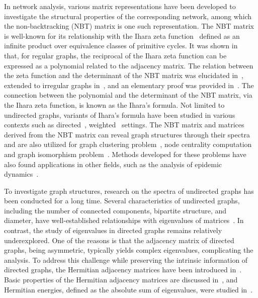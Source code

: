 \documentclass{article}
\theoremstyle{plain}
\begin{document}
In network analysis, various matrix representations have been developed to investigate the structural properties of the corresponding network,
among which the non-backtracking (NBT) matrix is one such representation.
The NBT matrix is well-known for its relationship with the Ihara zeta function~\citep{Ihara1966-bk} defined as an infinite product over equivalence classes of primitive cycles.
It was shown in~\citep{Ihara1966-bk,Sunada1986-kg} that, for regular graphs,
the reciprocal of the Ihara zeta function can be expressed as a polynomial related to the adjacency matrix.
The relation between the zeta function and the determinant of the NBT matrix was elucidated in~\citep{Hashimoto1989-su},
extended to irregular graphs in~\citep{Bass1992-ek}, and an elementary proof was provided in~\citep{Stark1996-mx}.
The connection between the polynomial and the determinant of the NBT matrix, via the Ihara zeta function, is known as the Ihara's formula.
Not limited to undirected graphs, variants of Ihara's formula have been studied in various contexts such as directed~\citep{Tarfulea2009-sy}, weighted~\citep{Kempton2016-ev,Konno2019-jd} settings.
The NBT matrix and matrices derived from the NBT matrix can reveal graph structures through their spectra~\citep{Jost2023-pj,Mulas2024-en}
and are also utilized for graph clustering problem~\citep{Krzakala2013-up,Newman2013-zc,Saade2014-vg,Bordenave2018-qo,Gulikers2017-iu}, node centrality computation~\citep{Martin2014-tv,Grindrod2018-va,Torres2021-nr,Timar2021-es} and graph isomorphism problem~\citep{Mulas2024-en}.
Methods developed for these problems have also found applications in other fields, such as the analysis of epidemic dynamics~\citep{Shrestha2015-ih, Radicchi2016-rm}.

To investigate graph structures, research on the spectra of undirected graphs has been conducted for a long time.
Several characteristics of undirected graphs, including the number of connected components, bipartite structure, and diameter,
have well-established relationships with eigenvalues of matrices~\citep{Chung1996-hp}.
In contrast, the study of eigenvalues in directed graphs remains relatively underexplored.
One of the reasons is that the adjacency matrix of directed graphs, being asymmetric, typically yields complex eigenvalues, complicating the analysis.
To address this challenge while preserving the intrinsic information of directed graphs, the Hermitian adjacency matrices have been introduced in~\citep{Guo2017-or,Liu2015-qu}.
Basic properties of the Hermitian adjacency matrices are discussed in~\citep{Guo2017-or},
and Hermitian energies, defined as the absolute sum of eigenvalues, were studied in~\citep{Liu2015-qu}.
\end{document}

